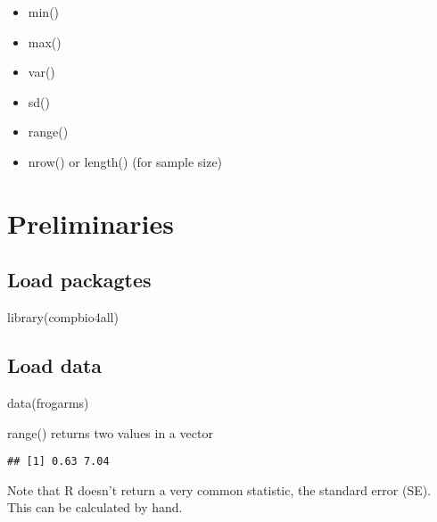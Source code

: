 \documentclass[
]{book}
\newenvironment{Shaded}{\begin{snugshade}}{\end{snugshade}}
\newcommand{\FunctionTok}[1]{\textcolor[rgb]{0.00,0.00,0.00}{#1}}
\newcommand{\NormalTok}[1]{#1}
\newcommand{\SpecialCharTok}[1]{\textcolor[rgb]{0.00,0.00,0.00}{#1}}
\providecommand{\tightlist}{%
  \setlength{\itemsep}{0pt}\setlength{\parskip}{0pt}}
\begin{document}
\begin{itemize}
\tightlist
\item
  min()
\item
  max()
\item
  var()
\item
  sd()
\item
  range()
\item
  nrow() or length() (for sample size)
\end{itemize}

\hypertarget{preliminaries-13}{%
\section{Preliminaries}\label{preliminaries-13}}

\hypertarget{load-packagtes-3}{%
\subsection{Load packagtes}\label{load-packagtes-3}}

\begin{Shaded}
\begin{Highlighting}[]
\FunctionTok{library}\NormalTok{(compbio4all)}
\end{Highlighting}
\end{Shaded}

\hypertarget{load-data-6}{%
\subsection{Load data}\label{load-data-6}}

\begin{Shaded}
\begin{Highlighting}[]
\FunctionTok{data}\NormalTok{(frogarms)}
\end{Highlighting}
\end{Shaded}

range() returns two values in a vector

\begin{Shaded}
\end{Shaded}

\begin{verbatim}
## [1] 0.63 7.04
\end{verbatim}

Note that R doesn't return a very common statistic, the standard error (SE). This can be calculated by hand.
\end{document}
